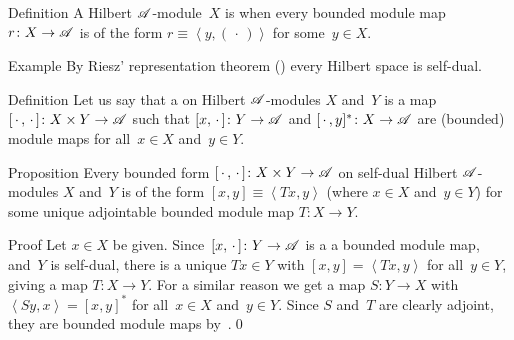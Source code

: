 \documentclass[a]{subfiles}
\begin{document}
\begin{parsec}%
\begin{point}{Definition}%
A Hilbert $\mathscr{A}$-module~$X$ is 
when every bounded module map $r\colon X\to \mathscr{A}$
is of the form $r\equiv \left<y,(\,\cdot\,)\right>$
for some~$y\in X$.
\end{point}
\begin{point}{Example}%
By Riesz' representation theorem ()
every Hilbert space is self-dual.
\end{point}
\begin{point}{Definition}%
Let us say that a 
on Hilbert $\mathscr{A}$-modules
$X$ and~$Y$
is a map $[\,\cdot\,,\,\cdot\,]\colon X\times Y\to \mathscr{A}$
such that $[x,\,\cdot\,]\colon Y\to \mathscr{A}$
and $[\,\cdot\,,y]^*\colon X\to \mathscr{A}$
are (bounded) module maps for all~$x\in X$ and~$y\in Y$.
\end{point}
\begin{point}{Proposition}%
Every bounded form  $[\,\cdot\,,\,\cdot\,]\colon X\times Y\rightarrow \mathscr{A}$
on self-dual Hilbert $\mathscr{A}$-modules
$X$ and~$Y$
is of the form
$[x,y]\equiv \left<Tx,y\right>$
(where $x\in X$ and~$y\in Y$)
for some unique adjointable bounded module map
$T\colon X\to Y$.
\begin{point}{Proof}%
Let $x\in X$ be given.
Since~$[x,\,\cdot\,]\colon Y\to \mathscr{A}$ is a
a bounded module map,
and~$Y$ is self-dual,
there is a unique $Tx\in Y$ with
$[x,y]=\left<Tx,y\right>$
for all~$y\in Y$,
giving a map $T\colon X\to Y$.
For a similar reason
we get a map $S\colon Y\to X$
with $\left<Sy,x\right>=[x,y]^*$ 
for all~$x\in X$ and~$y\in Y$.
Since $S$ and~$T$ are clearly adjoint,
they are bounded module maps by~.\qed
\end{point}
\end{point}
\end{parsec}
\end{document}
